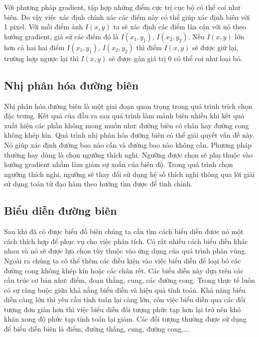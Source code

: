 \documentclass[12pt, oneside, a4]{book}
\begin{document}
Với phương pháp gradient, tập hợp những điểm cực trị cục bộ có thể coi như biên. Do vậy việc xác định chính xác các điểm này có thể giúp xác định biên với 1 pixel. Với mỗi điểm ảnh $I(x,y)$ ta sẽ xác định các điểm lân cận với  nó theo hướng gradient, giả sử các điểm đó là $I(x_1,y_1)$, $I(x_2,y_2)$. Nếu $I(x,y)$ lớn hơn cả hai hai điểm $I(x_1,y_1)$, $I(x_2,y_2)$  thì điểm $I(x,y)$ sẽ được giữ lại, trường hợp ngược lại thì $I(x,y)$ sẽ được gán giá trị 0 có thể coi như loại bỏ. 
\subsection{Nhị phân hóa đường biên}
Nhị phân hóa đường biên là một giai đoạn quan trọng trong quá trình trích chọn đặc trưng. Kết quả của đầu ra sau quá trình làm mảnh biên nhiều khi kết quả xuất hiện các phần không mong muốn như: đường biên có chân hay đường cong không khép kín. Quá trình nhị phân hóa đường biên có thể giải quyết vấn đề này. Nó giúp xác định đường bao nào cần và đường bao nào không cần. Phương pháp thường hay dùng là chọn ngưỡng thích nghi. Ngưỡng được chọn sẽ phụ thuộc vào  hướng gradient nhằm làm giảm sự xoắn của biên độ. Trong quá trình chọn ngưỡng thích nghi, ngưỡng sẽ thay đổi sử dụng   hệ số thích nghi thông qua lời giải sử dụng toán tử đạo hàm theo hướng tìm được để tinh chỉnh. 
\subsection{Biểu diễn đường biên}
Sau khi đã có được biểu đồ biên chúng ta cần tìm cách biểu diễn đươc nó một cách thích hợp để phục vụ cho việc phân tích. Có rất nhiều cách biểu diễn khác nhau và nó sẽ được lựa chọn  tùy thuộc vào ứng dụng của quá trình phân vùng. Ngoài ra chúng ta có thể thêm các điều kiện vào việc biểu diễn để loại bỏ các đường cong không khép kín hoặc các chân rết.  Các biểu diễn này dựa trên các cấu trúc cơ bản như: điểm, đoạn thằng, cung, các đường cong. Trong thực tế luôn có sự ràng buộc giữa khả nằng biểu diễn và hiệu quả tính toán. Khả năng biểu diễn càng lớn thì yêu cầu tính toán lại càng lớn, còn việc biểu diễn qua các đối tượng đơn giản hơn thì việc biểu diễn đối tượng phức tạp hơn lại trở nên khó khăn xong độ phức tạp tính toán lại giảm. Các đối tượng thường được sử dụng để biểu diễn biên là điểm, đường thẳng, cung, đường cong,...
\end{document}
